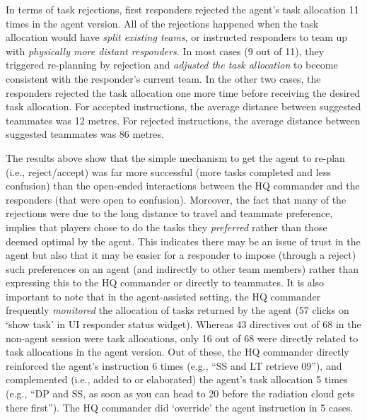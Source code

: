In terms of task rejections, first responders rejected the agent's task allocation 11 times in the agent version. All of the rejections happened when the task allocation would have \emph{split existing teams}, or instructed responders to team up with \emph{physically more distant responders}. In most cases (9 out of 11), they triggered re-planning by rejection and \emph{adjusted the task allocation} to become consistent with the responder's current team. In the other two cases, the responders rejected  the task allocation one more time before receiving the desired task allocation. For accepted instructions, the average distance between suggested teammates was 12 metres. For rejected instructions, the average distance between suggested teammates was 86 metres.

The results above show that  the simple mechanism to get the agent to re-plan (i.e., reject/accept) was far more successful (more tasks completed and less confusion) than the open-ended interactions between the HQ commander and the responders (that were open to confusion).  Moreover, the fact that many of the rejections were due to the long distance to travel and teammate preference, implies that players chose to do the tasks they \emph{preferred}  rather than those deemed optimal by the agent. This indicates there may be an issue of trust in the agent but also that it may be easier for a responder  to impose (through a reject) such preferences on an agent (and indirectly to other team members) rather than expressing this to the HQ commander or directly to teammates. 
It is also important to note that in the agent-assisted setting, the HQ commander frequently \emph{monitored} the allocation of tasks  returned by the agent (57 clicks on `show task' in UI responder status widget). Whereas 43 directives out of 68 in the non-agent session were task allocations, only 16 out of 68 were directly related to task allocations in the agent version. Out of these, the HQ commander directly reinforced the agent's instruction 6 times (e.g., ``SS and LT retrieve 09''), and complemented (i.e., added to or elaborated) the agent's task allocation 5 times (e.g., ``DP and SS, as soon as you can head to 20 before the radiation cloud gets there first''). The HQ commander  did `override' the agent instruction in 5 cases.  

